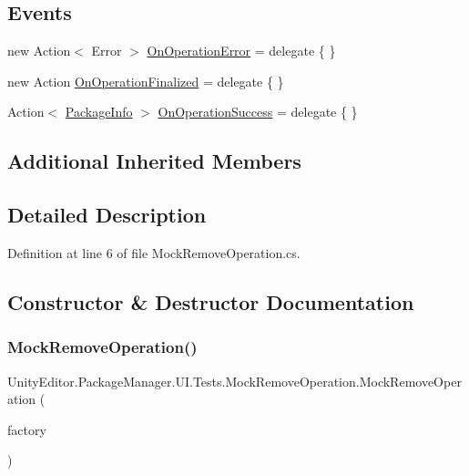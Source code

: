\subsection*{Events}
\begin{DoxyCompactItemize}
\item 
new Action$<$ Error $>$ \mbox{\hyperlink{class_unity_editor_1_1_package_manager_1_1_u_i_1_1_tests_1_1_mock_remove_operation_a4b9689b1558498c357feadef4fdef8f5}{On\+Operation\+Error}} = delegate \{ \}
\item 
new Action \mbox{\hyperlink{class_unity_editor_1_1_package_manager_1_1_u_i_1_1_tests_1_1_mock_remove_operation_a8af116b6227156dbca0b02f885a358db}{On\+Operation\+Finalized}} = delegate \{ \}
\item 
Action$<$ \mbox{\hyperlink{class_unity_editor_1_1_package_manager_1_1_u_i_1_1_package_info}{Package\+Info}} $>$ \mbox{\hyperlink{class_unity_editor_1_1_package_manager_1_1_u_i_1_1_tests_1_1_mock_remove_operation_a456bc48236cc795d9767bb2ee52191ae}{On\+Operation\+Success}} = delegate \{ \}
\end{DoxyCompactItemize}
\subsection*{Additional Inherited Members}


\subsection{Detailed Description}


Definition at line 6 of file Mock\+Remove\+Operation.\+cs.



\subsection{Constructor \& Destructor Documentation}
\mbox{\label{class_unity_editor_1_1_package_manager_1_1_u_i_1_1_tests_1_1_mock_remove_operation_a2e3a6f7f91c00c2820813ea1dc426718}} 
\subsubsection{\texorpdfstring{MockRemoveOperation()}{MockRemoveOperation()}}
{\footnotesize\ttfamily Unity\+Editor.\+Package\+Manager.\+U\+I.\+Tests.\+Mock\+Remove\+Operation.\+Mock\+Remove\+Operation (\begin{DoxyParamCaption}\item[{\mbox{\hyperlink{class_unity_editor_1_1_package_manager_1_1_u_i_1_1_tests_1_1_mock_operation_factory}{Mock\+Operation\+Factory}}}]{factory }\end{DoxyParamCaption})}



